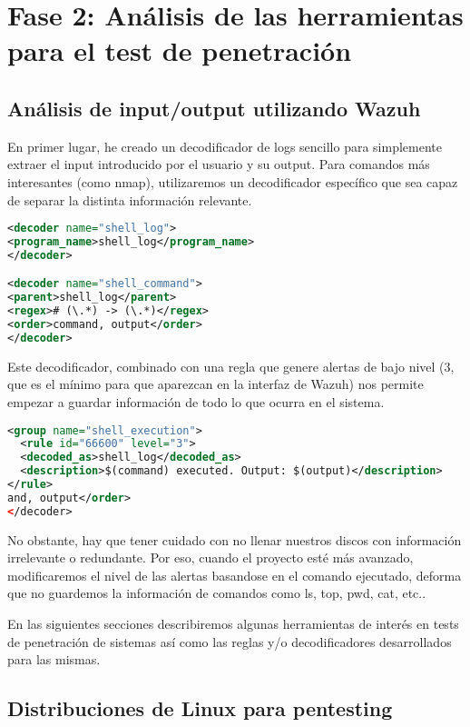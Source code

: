 \chapter{Fase 2: Análisis de las herramientas para el test de penetración}

\section{Análisis de input/output utilizando Wazuh}

En primer lugar, he creado un decodificador de logs sencillo para simplemente extraer el input introducido por el usuario y su output. Para comandos más interesantes (como nmap), utilizaremos un decodificador específico que sea capaz de separar la distinta información relevante.


\begin{lstlisting}[language=XML, caption=Custom base decoder for command execution logger]
<decoder name="shell_log">
<program_name>shell_log</program_name>
</decoder>

<decoder name="shell_command">
<parent>shell_log</parent>
<regex># (\.*) -> (\.*)</regex>
<order>command, output</order>
</decoder>
\end{lstlisting}

Este decodificador, combinado con una regla que genere alertas de bajo nivel (3, que es el mínimo para que aparezcan en la interfaz de Wazuh) nos permite empezar a guardar información de todo lo que ocurra en el sistema.

\begin{lstlisting}[language=XML, caption=Custom base rule for command execution logger]
<group name="shell_execution">
  <rule id="66600" level="3">
  <decoded_as>shell_log</decoded_as>
  <description>$(command) executed. Output: $(output)</description>
</rule>
and, output</order>
</decoder>
\end{lstlisting}

No obstante, hay que tener cuidado con no llenar nuestros discos con información irrelevante o redundante. Por eso, cuando el proyecto esté más avanzado, modificaremos el nivel de las alertas basandose en el comando ejecutado, deforma que no guardemos la información de comandos como ls, top, pwd, cat, etc..

En las siguientes secciones describiremos algunas herramientas de interés en tests de penetración de sistemas así como las reglas y/o decodificadores desarrollados para las mismas.

\section{Distribuciones de Linux para pentesting}
